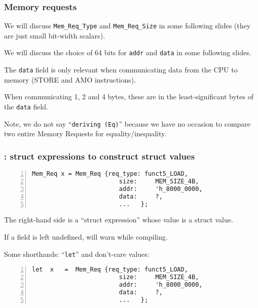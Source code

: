 \begin{frame}[fragile]
\frametitle{Memory requests}

\footnotesize


\vspace{2ex}

We will discuss {\tt Mem\_Req\_Type} and {\tt Mem\_Req\_Size} in some
following slides (they are just small bit-width scalars).

We will discuss the choice of 64 bits for {\tt addr} and {\tt data} in
some following slides.

\vspace{1ex}

The {\tt data} field is only relevant when communicating data from the
CPU to memory (STORE and AMO instructions).

\vspace{2ex}

When communicating 1, 2 and 4 bytes, these are in the
least-significant bytes of the {\tt data} field.

\PAUSE{\vspace{4ex}}

Note, we do not say ``{\tt deriving (Eq)}'' because we have no
occasion to compare two entire Memory Requests for
equality/inequality.

\end{frame}


\begin{frame}[fragile]
\frametitle{{\BSV}: struct expressions to construct struct values}

\footnotesize

\begin{Verbatim}[frame=single, numbers=left]
   Mem_Req x = Mem_Req {req_type: funct5_LOAD,
                        size:     MEM_SIZE_4B,
                        addr:     'h_8000_0000,
                        data:     ?,
                        ...   };
\end{Verbatim}
The right-hand side is a ``struct expression'' whose value is a struct value.

\vspace{1ex}

If a field is left undefined, {\bsc} will warn while compiling.

\PAUSE{\vspace*{4ex}}

Some shorthands: ``{\tt let}'' and don't-care values:

\vspace*{2ex}

\begin{Verbatim}[frame=single, numbers=left]
   let  x   =  Mem_Req {req_type: funct5_LOAD,
                        size:     MEM_SIZE_4B,
                        addr:     'h_8000_0000,
                        data:     ?,
                        ...   };
\end{Verbatim}

\end{frame}

